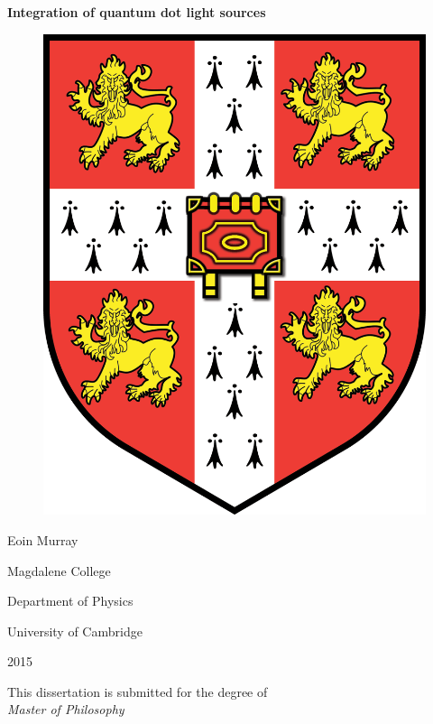 

\begin{center} \LARGE{\textbf{Integration of quantum dot light sources}}
\end{center}

\vspace{1cm}

\begin{figure}[h] \begin{center}
\includegraphics[scale=0.15]{images/cam_logo.png} \end{center} \end{figure}

\begin{center} \Large{Eoin Murray} \par \normalsize{Magdalene College} \par
\normalsize{Department of Physics} \par \normalsize{University of Cambridge}
\par 2015 \end{center}

\begin{center} This dissertation is submitted for the degree of \\ \textit{Master
of Philosophy} \end{center}
